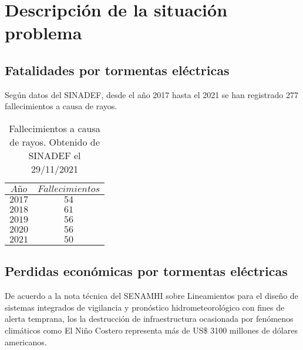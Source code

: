 \section{Descripción de la situación problema}

\subsection{Fatalidades por tormentas eléctricas}

Según datos del SINADEF, desde el año 2017 hasta el 2021 se han registrado 277 
fallecimientos a causa de rayos.

\begin{table}[h]
  \centering
  \label{tab:fallecimientos_rayo}
  \caption{Fallecimientos a causa de rayos. Obtenido de SINADEF el 29/11/2021}
  \begin{tabular}{cc}
    $Año$ & $Fallecimientos$\\
    \hline
    $2017$ & $54$\\
    $2018$ & $61$\\
    $2019$ & $56$\\
    $2020$ & $56$\\
    $2021$ & $50$\\
    \end{tabular}
\end{table}


\subsection{Perdidas económicas por tormentas eléctricas}

De acuerdo a la nota técnica del SENAMHI sobre Lineamientos para el diseño de 
sistemas integrados de vigilancia y pronóstico hidrometeorológico con fines de 
alerta temprana, los la destrucción de infraestructura ocasionada por fenómenos 
climáticos como El Niño Costero representa más de US\$ 3100 millones de dólares
americanos.

